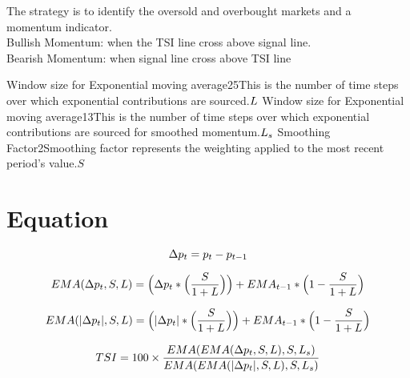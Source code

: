 \documentclass{article}
\begin{document}
\logo
{} %
\tblofcontents


\howtotrade
{The strategy is to identify the oversold and overbought markets and a momentum indicator. \\
Bullish Momentum: when the TSI line cross above signal line. \\
Bearish Momentum: when signal line cross above TSI line
}


{Window size for Exponential moving average}{25}{This is the number of time steps over which exponential contributions are sourced.}{$L$}
{Window size for Exponential moving average}{13}{This is the number of time steps over which exponential contributions are sourced for smoothed momentum.}{$L_{s}$}
{Smoothing Factor}{2}{Smoothing factor represents the weighting applied to the most recent period’s value.}{$S$}
\stoptable

\newpage
\section{Equation}
\begin{equation}
    \Delta p_{t} = p_{t} - p_{t - 1}
\end{equation}

\begin{equation}
    EMA(\Delta p_{t}, S, L) = \Big(\Delta p_{t} * \Big(\frac{S}{1 + L}\Big)\Big) + EMA_{t-1} * \Big(1-\frac{S}{1 + L}\Big)
\end{equation}

\begin{equation}
    EMA(|\Delta p_{t}|, S, L) = \Big(|\Delta p_{t}| * \Big(\frac{S}{1 + L}\Big)\Big) + EMA_{t-1} * \Big(1-\frac{S}{1 + L}\Big)
\end{equation}

\begin{equation}
    TSI = 100 \times \frac{EMA(EMA(\Delta p_{t}, S, L), S, L_{s})}{EMA(EMA(|\Delta p_{t}|, S, L), S,L_{s})}
\end{equation}
\\
\end{document}
